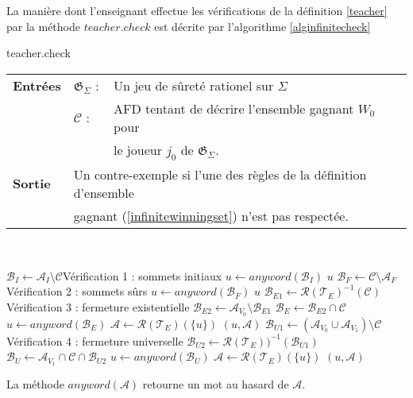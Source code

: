 \documentclass[12pt,a4paper,oneside,titlepage]{report}
\begin{document}
La manière dont l'enseignant effectue les vérifications de la définition \ref{teacher} par la méthode $teacher.check$ est décrite par l'algorithme \ref{alginfinitecheck}
\begin{algorithm}[H]
\caption{teacher.check}\label{alginfinitecheck}
\hspace*{\algorithmicindent} 
\begin{tabular}{lll}
	\textbf{Entrées} & \textbf{$\mathfrak{G}_\Sigma$} : &Un jeu de sûreté rationel sur $\Sigma$\\
	&\textbf{$\mathcal{C}$} : &AFD tentant de décrire l'ensemble gagnant $W_0$ pour\\
	&&le joueur $j_0$ de $\mathfrak{G}_\Sigma$.\\
	\textbf{Sortie} &\multicolumn{2}{l}{Un contre-exemple si l'une des règles de la définition d'ensemble}\\
	&\multicolumn{2}{l}{gagnant (\ref{infinitewinningset}) n'est pas respectée.}
\end{tabular}\\
\begin{algorithmic}[1]
\State $\mathcal{B}_I\gets\mathcal{A}_I\setminus\mathcal{C}$\Comment Vérification 1 : sommets initiaux 
	\State $u\gets anyword(\mathcal{B}_I)$
	\State\Return $u$
\EndIf
\State $\mathcal{B}_F\gets\mathcal{C}\setminus\mathcal{A}_F$\Comment Vérification 2 : sommets sûrs
	\State $u\gets anyword(\mathcal{B}_F)$
	\State\Return $u$
\EndIf
\State $\mathcal{B}_{E1}\gets\mathcal{R}(\mathcal{T}_E)^{-1}(\mathcal{C})$\Comment Vérification 3 : fermeture existentielle
\State $\mathcal{B}_{E2}\gets\mathcal{A}_{V_0}\setminus\mathcal{B}_{E1}$
\State $\mathcal{B}_E\gets\mathcal{B}_{E2}\cap\mathcal{C}$
	\State $u\gets anyword(\mathcal{B}_E)$
	\State $\mathcal{A}\gets\mathcal{R}(\mathcal{T}_E)(\{u\})$
	\State\Return $(u,\mathcal{A})$ 
\EndIf
\State $\mathcal{B}_{U1}\gets(\mathcal{A}_{V_0}\cup\mathcal{A}_{V_1})\setminus\mathcal{C}$\Comment Vérification 4 : fermeture universelle
\State $\mathcal{B}_{U2}\gets\mathcal{R}(\mathcal{T}_E))^{-1}(\mathcal{B}_{U1})$
\State $\mathcal{B}_U\gets\mathcal{A}_{V_1}\cap\mathcal{C}\cap\mathcal{B}_{U2}$
	\State $u\gets anyword(\mathcal{B}_U)$
	\State $\mathcal{A}\gets\mathcal{R}(\mathcal{T}_E)(\{u\})$
	\State\Return $(u,\mathcal{A})$ 
\EndIf
\end{algorithmic}
\end{algorithm}
\noindent La méthode $anyword(\mathcal{A})$ retourne un mot au hasard de $\mathcal{A}$.\\
\end{document}
